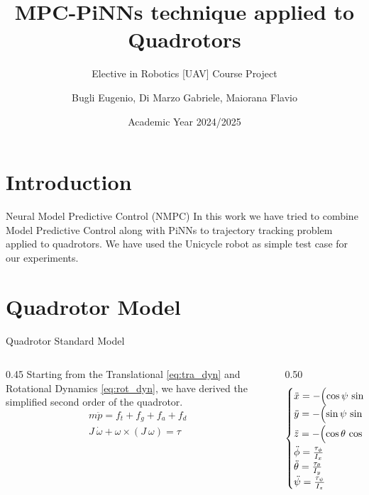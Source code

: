\documentclass{beamer}
\title{MPC-PiNNs technique applied to Quadrotors}
\subtitle{Elective in Robotics [UAV] Course Project}
\author{{Bugli Eugenio}, {Di Marzo Gabriele}, {Maiorana Flavio}} %
\date{Academic Year 2024/2025}
\begin{document}
\maketitle
\section{Introduction}
\begin{frame}{Neural Model Predictive Control (NMPC)}
    In this work we have tried to combine Model Predictive Control along with PiNNs to trajectory tracking problem applied to quadrotors. We have used the Unicycle robot as simple test case for our experiments.
\end{frame}
\section{Quadrotor Model}

\begin{frame}{Quadrotor Standard Model}
    \begin{columns}[T] %
        \begin{column}{0.45\textwidth}
            \vspace{0.4cm}
            Starting from the Translational \eqref{eq:tra_dyn} and Rotational Dynamics \eqref{eq:rot_dyn}, we have derived the simplified second order of the quadrotor.
            \begin{align}
                \label{eq:tra_dyn}
                m \ddot{p} = f_{t} + f_{g} + f_{a} + f_{d} \\
                \label{eq:rot_dyn}
                J \ \dot{\omega} + \omega \times (J \ \omega) = \tau 
            \end{align}
        \end{column}
        
        \begin{column}{0.50\textwidth}
            \vspace{-0.2cm}
            \begin{align}
                \begin{cases}
                    \ddot{x} = -\Bigl(\cos\psi\, \sin\theta\, \cos\phi + \sin\psi\, \sin\phi\Bigr)\frac{T}{m}, \\
                    \ddot{y} = -\Bigl(\sin\psi\, \sin\theta\, \cos\phi - \cos\psi\, \sin\phi\Bigr)\frac{T}{m}, \\
                    \ddot{z} = -\Bigl(\cos\theta\, \cos\phi\Bigr)\dfrac{T}{m} + g, \\[1ex]
                    \ddot{\phi}   = \frac{\tau_{\phi}}{I_{x}} \\
                    \ddot{\theta} = \frac{\tau_{\theta}}{I_{y}} \\
                    \ddot{\psi}   = \frac{\tau_{\psi}}{I_{z}} 
                \end{cases}
            \end{align}
        \end{column}
    \end{columns}
\end{frame}
\end{document}
